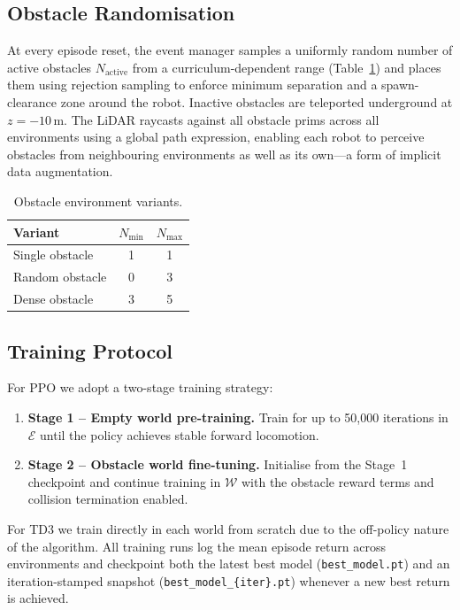 \documentclass{article}
\begin{document}
\subsection{Obstacle Randomisation}

At every episode reset, the event manager samples a uniformly random number of
active obstacles $N_\text{active}$ from a curriculum-dependent range
(Table~\ref{tab:curricula}) and places them using rejection sampling to
enforce minimum separation and a spawn-clearance zone around the robot.
Inactive obstacles are teleported underground at $z = -10$\,m.
The LiDAR raycasts against all obstacle prims across all environments using
a global path expression, enabling each robot to perceive obstacles from
neighbouring environments as well as its own—a form of implicit data
augmentation.

\begin{table}[h]
  \centering
  \caption{Obstacle environment variants.}
  \label{tab:curricula}
  \begin{tabular}{lcc}
    \toprule
    \textbf{Variant} & $N_\text{min}$ & $N_\text{max}$ \\
    \midrule
    Single obstacle & 1 & 1 \\
    Random obstacle & 0 & 3 \\
    Dense obstacle  & 3 & 5 \\
    \bottomrule
  \end{tabular}
\end{table}

\subsection{Training Protocol}

For PPO we adopt a two-stage training strategy:
\begin{enumerate}
  \item \textbf{Stage 1 – Empty world pre-training.} Train for up to 50{,}000
        iterations in $\mathcal{E}$ until the policy achieves stable
        forward locomotion.
  \item \textbf{Stage 2 – Obstacle world fine-tuning.} Initialise from the
        Stage~1 checkpoint and continue training in $\mathcal{W}$ with the
        obstacle reward terms and collision termination enabled.
\end{enumerate}
For TD3 we train directly in each world from scratch due to the off-policy
nature of the algorithm.
All training runs log the mean episode return across environments and
checkpoint both the latest best model (\texttt{best\_model.pt}) and an
iteration-stamped snapshot (\texttt{best\_model\_\{iter\}.pt}) whenever a
new best return is achieved.
\end{document}

